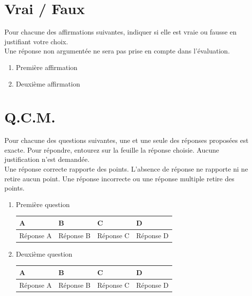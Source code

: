 \documentclass[oneside,12pt]{exam}          %
\begin{document}
\section{Vrai / Faux}
Pour chacune des affirmations suivantes, indiquer si elle est vraie ou fausse en justifiant votre choix. \\
Une réponse non argumentée ne sera pas prise en compte dans l’évaluation.

\begin{enumerate}[label=\underline{Affirmation \no \arabic*} : ,leftmargin=* , itemsep=1mm]
	\item Première affirmation
	\item Deuxième affirmation
\end{enumerate}



\section{Q.C.M.}
Pour chacune des questions suivantes, une et une seule des réponses proposées est exacte. Pour répondre, entourez sur la feuille la réponse choisie. Aucune justification n'est demandée. \\
Une réponse correcte rapporte des points. L'absence de réponse ne rapporte ni ne retire aucun point. Une réponse incorrecte ou une réponse multiple retire des points.

\begin{enumerate}[label=\underline{Question \no\arabic*} :  , leftmargin=* , itemsep=1mm]
	\item Première question
	
		\hspace{\linewidth-\textwidth}
		\renewcommand{\arraystretch}{1.5}
		\begin{tabular}{| P{0.22\textwidth} | P{0.22\textwidth} | P{0.22\textwidth} | P{0.22\textwidth} |} \hline
			A & B & C & D \\ \hline
			Réponse A & Réponse B & Réponse C & Réponse D \\ \hline
		\end{tabular}
		
	\item Deuxième question
	
		\hspace{\linewidth-\textwidth}
		\renewcommand{\arraystretch}{1.5}
		\begin{tabular}{| P{0.22\textwidth} | P{0.22\textwidth} | P{0.22\textwidth} | P{0.22\textwidth} |} \hline
			A & B & C & D \\ \hline
			Réponse A & Réponse B & Réponse C & Réponse D \\ \hline
		\end{tabular}
		
\end{enumerate}
\end{document}
